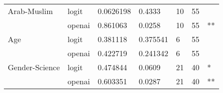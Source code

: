 \begin{tabular}{lllllll}
Arab-Muslim & logit &  0.0626198 &      0.4333 &  10 &  55 &      \\
               & openai &   0.861063 &      0.0258 &  10 &  55 &   ** \\
Age & logit &   0.381118 &    0.375541 &   6 &  55 &      \\
               & openai &   0.422719 &    0.241342 &   6 &  55 &      \\
Gender-Science & logit &   0.474844 &      0.0609 &  21 &  40 &    * \\
               & openai &   0.603351 &      0.0287 &  21 &  40 &   ** \\
\bottomrule
\end{tabular}
